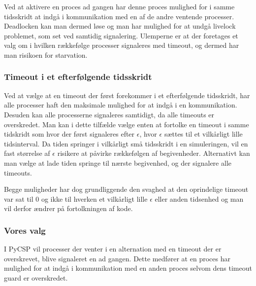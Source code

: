 \begin{shaded}
Ved at aktivere en proces ad gangen har denne proces mulighed for i
samme tidsskridt at indgå i kommunikation med en af de andre ventende
processer. Deadlocken kan man dermed løse og man har mulighed for at
undgå livelock problemet, som set ved samtidig signalering. Ulemperne er at der
foretages et valg om i hvilken rækkefølge  processer signaleres med timeout,
og dermed har man risikoen for starvation.


\subsubsection{Timeout i et efterfølgende tidsskridt} 
Ved at vælge at en timeout der først forekommer i et efterfølgende tidsskridt, har alle
processer haft den maksimale mulighed for at indgå i en kommunikation.
Desuden kan alle processerne signaleres samtidigt, da  alle timeouts
er overskredet. Man kan i dette tilfælde  vælge enten at fortolke en timeout i samme
tidskridt som hvor der først signaleres efter $\epsilon$, hvor $\epsilon$ sættes til
et vilkårligt lille tidsinterval. Da tiden springer i vilkårligt små
tidsskridt i en simuleringen, vil en fast størrelse af $\epsilon$
risikere at påvirke rækkefølgen af begivenheder. Alternativt kan man vælge
at lade tiden springe til nærste begivenhed, og der signalere alle timeouts.

Begge muligheder har dog grundliggende den svaghed at den oprindelige timeout var sat til
0 og ikke til hverken et vilkårligt lille $\epsilon$ eller anden
tidsenhed og man vil derfor ændrer på fortolkningen af kode. 
\end{shaded}
\subsubsection{Vores valg}
I PyCSP vil processer der venter i en alternation med en timeout der er overskrevet, blive signaleret en ad gangen. Dette
medfører at en proces har mulighed for at indgå i kommunikation med en anden proces selvom dens timeout guard er overskredet. 


